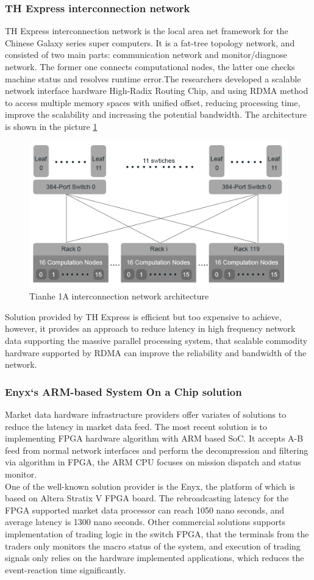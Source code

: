 \documentclass[11pt,openright,a4paper]{report}
\begin{document}
\subsubsection{TH Express interconnection network}
TH Express interconnection network is the local area net framework for the Chinese Galaxy series super computers. It is a fat-tree topology network, and consisted of two main parts: communication network and monitor/diagnose network\cite{yang2011tianhe}. The former one connects computational nodes, the latter one checks machine status and resolves runtime error.The researchers developed a scalable network interface hardware High-Radix Routing Chip, and using RDMA method to access multiple memory spaces with unified offset, reducing processing time, improve the scalability and increasing the potential bandwidth. The architecture is shown in the picture \ref{fig:tianhe1a}\\
\begin{figure}
	\centering
	\includegraphics[width=0.7\linewidth]{picture/tianhe1A.PNG}
	\caption{Tianhe 1A interconnection network architecture}
	\label{fig:tianhe1a}
\end{figure}
Solution provided by TH Express is efficient but too expensive to achieve, however, it provides an approach to reduce latency in high frequency network data supporting the massive parallel processing system, that scalable commodity hardware supported by RDMA can improve the reliability and bandwidth of the network.\\
\subsubsection{Enyx`s ARM-based System On a Chip solution}
Market data hardware infrastructure providers offer variates of solutions to reduce the latency in market data feed. The most recent solution is to implementing FPGA hardware algorithm with ARM based SoC. It accepts A-B feed from normal network interfaces and perform the decompression and filtering via algorithm in FPGA, the ARM CPU focuses on mission dispatch and status monitor.\\
One of the well-known solution provider is the Enyx, the platform of which is based on Altera Stratix V FPGA board. The rebroadcasting latency for the FPGA supported market data processor can reach 1050 nano seconds, and average latency is 1300 nano seconds\cite{ciscoWhitePaper}. Other commercial solutions supports implementation of trading logic in the switch FPGA, that the terminals from the traders only monitors the macro status of the system, and execution of trading signals only relies on the hardware implemented applications, which reduces the event-reaction time significantly.\\ 
\end{document}
